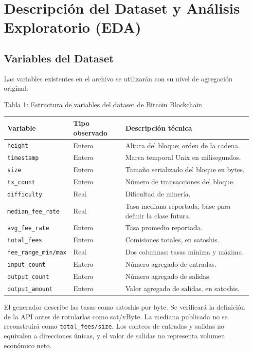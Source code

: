\documentclass[11pt,a4paper]{article}
\begin{document}
\newpage

\section{Descripción del Dataset y Análisis Exploratorio (EDA)}

\subsection{Variables del Dataset}

Las variables existentes en el archivo se utilizarán con su nivel de agregación original:

\begin{center}
{\small Tabla 1: Estructura de variables del dataset de Bitcoin Blockchain}\par
\small
\begin{tabularx}{\linewidth}{@{}l l X@{}}
\hline
\textbf{Variable} & \textbf{Tipo observado} & \textbf{Descripción técnica}\\\hline
\texttt{height} & Entero & Altura del bloque; orden de la cadena.\\
\texttt{timestamp} & Entero & Marca temporal Unix en milisegundos.\\
\texttt{size} & Entero & Tamaño serializado del bloque en bytes.\\
\texttt{tx\_count} & Entero & Número de transacciones del bloque.\\
\texttt{difficulty} & Real & Dificultad de minería.\\
\texttt{median\_fee\_rate} & Real & Tasa mediana reportada; base para definir la clase futura.\\
\texttt{avg\_fee\_rate} & Entero & Tasa promedio reportada.\\
\texttt{total\_fees} & Entero & Comisiones totales, en satoshis.\\
\texttt{fee\_range\_min/max} & Real & Dos columnas: tasas mínima y máxima.\\
\texttt{input\_count} & Entero & Número agregado de entradas.\\
\texttt{output\_count} & Entero & Número agregado de salidas.\\
\texttt{output\_amount} & Entero & Valor agregado de salidas, en satoshis.\\\hline
\end{tabularx}
\end{center}

{\small El generador describe las tasas como satoshis por byte. Se verificará la definición de la API antes de rotularlas como sat/vByte. La mediana publicada no se reconstruirá como \texttt{total\_fees/size}. Los conteos de entradas y salidas no equivalen a direcciones únicas, y el valor de salidas no representa volumen económico neto.}
\end{document}
